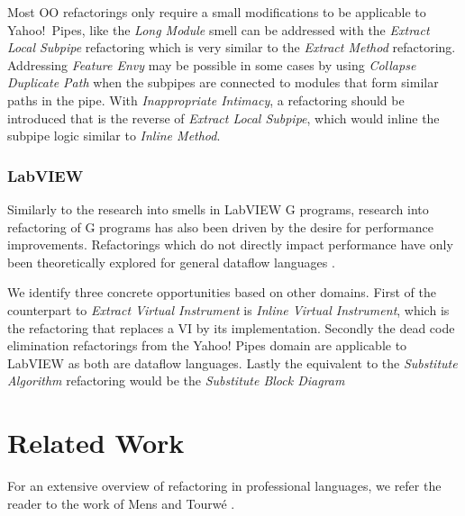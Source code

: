 \documentclass[10pt,conference,compsocconf]{IEEEtran}
\begin{document}
Most OO refactorings only require a small modifications to be applicable to Yahoo!\ Pipes, like the \emph{Long Module} smell can be addressed with the  \emph{Extract Local Subpipe} refactoring which is very similar to the \emph{Extract Method} refactoring.
Addressing \emph{Feature Envy} may be possible in some cases by using \emph{Collapse Duplicate Path} when the subpipes are connected to modules that form similar paths in the pipe.
With \emph{Inappropriate Intimacy}, a refactoring should be introduced that is the reverse of \emph{Extract Local Subpipe}, which would inline the subpipe logic similar to \emph{Inline Method}.


\subsubsection{LabVIEW}

Similarly to the research into smells in LabVIEW G programs, research into refactoring of G programs has also been driven by the desire for performance improvements. Refactorings which do not directly impact performance have only been theoretically explored for general dataflow languages \cite{sui2008automated}.

We identify three concrete opportunities based on other domains.
First of the counterpart to \emph{Extract Virtual Instrument} is \emph{Inline Virtual Instrument}, which is the refactoring that replaces a VI by its implementation.
Secondly the dead code elimination refactorings from the Yahoo! Pipes domain are applicable to LabVIEW as both are dataflow languages.
Lastly the equivalent to the \emph{Substitute Algorithm} refactoring would be the \emph{Substitute Block Diagram}

\section{Related Work}

For an extensive overview of refactoring in professional languages, we refer the reader to the work of Mens and Tourw\'{e} \cite{mens2004survey}.
\end{document}
